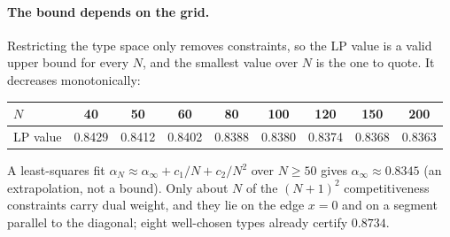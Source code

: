 \paragraph{The bound depends on the grid.} Restricting the type space only removes constraints,
so the LP value is a valid upper bound for every $N$, and the smallest value over $N$ is the one
to quote. It decreases monotonically:
\begin{center}
\begin{tabular}{lcccccccc}
\toprule
$N$ & 40 & 50 & 60 & 80 & 100 & 120 & 150 & 200\\
\midrule
LP value & 0.8429 & 0.8412 & 0.8402 & 0.8388 & 0.8380 & 0.8374 & 0.8368 & 0.8363\\
\bottomrule
\end{tabular}
\end{center}
A least-squares fit $\alpha_N\approx\alpha_\infty+c_1/N+c_2/N^2$ over $N\ge50$ gives
$\alpha_\infty\approx0.8345$ (an extrapolation, not a bound). Only about $N$ of the $(N+1)^2$
competitiveness constraints carry dual weight, and they lie on the edge $x=0$ and on a segment
parallel to the diagonal; eight well-chosen types already certify $0.8734$.
